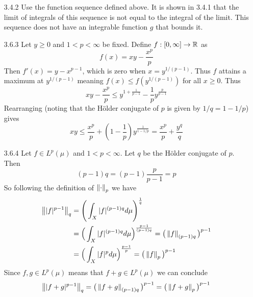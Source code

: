 \documentclass[../../Solutions.tex]{subfiles}
\begin{document}
\begin{itemize}
	\item [3.4.2] Use the function sequence defined above.
		It is shown in 3.4.1 that the limit of integrals of this sequence is not equal to the integral of the limit.
		This sequence does not have an integrable function $g$ that bounds it.
	
	\item [3.6.3] Let $y \geq 0$ and $1 < p < \infty$ be fixed.
		Define $f:[0,\infty]\to\mathbb{R}$ as
		$$ f(x) = xy - \frac{x^p}{p} $$
		Then $f'(x) = y - x^{p-1}$, which is zero when $x = y^{1/(p-1)}$.
		Thus $f$ attains a maximum at $y^{1/(p-1)}$ meaning $f(x) \leq f(y^{1/(p-1)})$ for all $x \geq 0$.
		Thus
		$$ xy - \frac{x^p}{p} \leq y^{1+\frac{1}{p-1}} - \frac{1}{p}y^{\frac{p}{p-1}} $$
		Rearranging (noting that the H\"older conjugate of $p$ is given by $1/q = 1-1/p$) gives
		$$ xy \leq \frac{x^p}{p} + \left(1-\frac{1}{p}\right)y^{\frac{1}{1-1/p}} = \frac{x^p}{p} + \frac{y^q}{q} $$
	
	\item [3.6.4] Let $f \in L^p(\mu)$ and $1 < p < \infty$.
		Let $q$ be the H\"older conjugate of $p$.
		Then
		$$ (p-1)q = (p-1)\frac{p}{p-1} = p $$
		So following the definition of $\left\lVert\cdot\right\rVert_p$ we have
		\begin{equation*} \begin{split}
			\left\lVert|f|^{p-1}\right\rVert_q & = \Bigg(\int_{X} |f|^{(p-1)q} d\mu\Bigg)^\frac{1}{q} \\
				& = \Big(\int_{X} |f|^{(p-1)q} d\mu\Big)^\frac{p-1}{(p-1)q} = \big(\left\lVert f\right\rVert_{(p-1)q}\big)^{p-1} \\
				& = \Big(\int_{X} |f|^p d\mu \Big)^\frac{p-1}{p} = \big(\left\lVert f\right\rVert_p\big)^{p-1}
		\end{split} \end{equation*}
		Since $f,g \in L^p(\mu)$ means that $f+g \in L^p(\mu)$ we can conclude
		$$ \left\lVert|f+g|^{p-1}\right\rVert_q = \big(\left\lVert f+g\right\rVert_{(p-1)q}\big)^{p-1} = \big(\left\lVert f+g\right\rVert_p\big)^{p-1} $$
	

\end{itemize}
\end{document}
